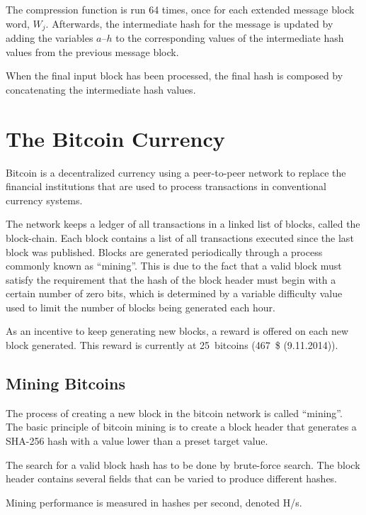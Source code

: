 The compression function is run 64 times, once for each extended message block word,
$W_j$. Afterwards, the intermediate hash for the message is updated by adding the
variables $a$--$h$ to the corresponding values of the intermediate hash values from
the previous message block.

When the final input block has been processed, the final hash is composed by
concatenating the intermediate hash values.

\section{The Bitcoin Currency}
Bitcoin is a decentralized currency using a peer-to-peer network to replace
the financial institutions that are used to process transactions in conventional
currency systems.

The network keeps a ledger of all transactions in a linked list of blocks, called the
block-chain. Each block contains a list of all transactions executed since the last
block was published. Blocks are generated periodically through a process
commonly known as ``mining''. This is due to the fact that a valid block must satisfy
the requirement that the hash of the block header must begin with a certain number of
zero bits, which is determined by a variable difficulty value used to limit the number
of blocks being generated each hour\cite{bitcoin}.

As an incentive to keep generating new blocks, a reward is offered on each new block
generated. This reward is currently at 25~bitcoins (467~\$ (9.11.2014)).

\subsection{Mining Bitcoins}
The process of creating a new block in the bitcoin network is called ``mining''. The basic
principle of bitcoin mining is to create a block header that generates a SHA-256 hash with
a value lower than a preset target value.

The search for a valid block hash has to be done by brute-force search. The block header
contains several fields that can be varied to produce different hashes.

Mining performance is measured in hashes per second, denoted H/s.


